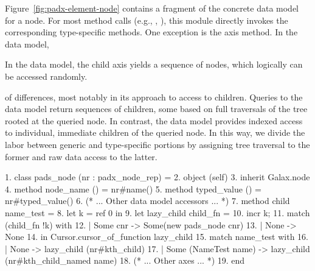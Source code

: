 Figure~\ref{fig:padx-element-node} contains a fragment of the \padx{}
concrete data model for a node.  For most method calls (e.g.,
, ), this module directly invokes 
the corresponding type-specific methods.  One exception is the
 axis method.  In the \padx{} data model, 

In the \Galax{} data model, the child axis yields a
sequence of nodes, which logically can be accessed randomly.  

 of differences, most notably in its approach
to access to children.  Queries to the \galax data model return
sequences of children, some based on full traversals of the tree
rooted at the queried node. In contrast, the \padx{} data model
provides indexed access to individual, immediate children of the
queried node. In this way, we divide the labor between generic and
type-specific portions by assigning tree traversal to the former and
raw data access to the latter.

\begin{figure*}
\begin{small}
\begin{code}
{ 1}. class pads\_node (nr : padx\_node\_rep) =  
{ 2}. object (self)
{ 3}.   inherit Galax.node
{ 4}.   method node\_name   () = nr#name()
{ 5}.   method typed\_value () = nr#typed_value() 
{ 6}.   (* ... Other data model accessors ... *)
\mbox{}
{ 7}.   method child name\_test =  
{ 8}.     let k = ref 0 in
{ 9}.     let lazy\_child child\_fn = 
{10}.      incr k;
{11}.       match (child\_fn !k) with
{12}.       | Some cnr ->  Some(new pads\_node cnr)
{13}.       | None -> None
{14}.       in Cursor.cursor\_of\_function lazy\_child
{15}.     match name\_test with 
{16}.     | None ->  lazy\_child (nr#kth\_child)
{17}.     | Some (NameTest name) -> lazy\_child (nr#kth\_child\_named name)
\mbox{}
{18}.   (* ... Other axes ... *)
{19}. end
\end{code}
\end{small}
\caption{Fragment of the \padx{} concrete data model}
\label{fig:padx-element-node}
\end{figure*}


